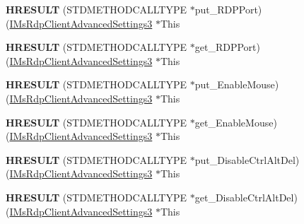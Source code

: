 \begin{DoxyCompactItemize}
{\bfseries H\+R\+E\+S\+U\+LT} (S\+T\+D\+M\+E\+T\+H\+O\+D\+C\+A\+L\+L\+T\+Y\+PE $\ast$put\+\_\+\+R\+D\+P\+Port)(\hyperlink{interface_m_s_t_s_c_lib_1_1_i_ms_rdp_client_advanced_settings3}{I\+Ms\+Rdp\+Client\+Advanced\+Settings3} $\ast$This
\item 
\mbox{\label{struct_m_s_t_s_c_lib_1_1_i_ms_rdp_client_advanced_settings3_vtbl_a5842e89ca96adf855c960ec213bbe825}} 
{\bfseries H\+R\+E\+S\+U\+LT} (S\+T\+D\+M\+E\+T\+H\+O\+D\+C\+A\+L\+L\+T\+Y\+PE $\ast$get\+\_\+\+R\+D\+P\+Port)(\hyperlink{interface_m_s_t_s_c_lib_1_1_i_ms_rdp_client_advanced_settings3}{I\+Ms\+Rdp\+Client\+Advanced\+Settings3} $\ast$This
\item 
\mbox{\label{struct_m_s_t_s_c_lib_1_1_i_ms_rdp_client_advanced_settings3_vtbl_a4bc63d3a36edd831dcecfd59903cce02}} 
{\bfseries H\+R\+E\+S\+U\+LT} (S\+T\+D\+M\+E\+T\+H\+O\+D\+C\+A\+L\+L\+T\+Y\+PE $\ast$put\+\_\+\+Enable\+Mouse)(\hyperlink{interface_m_s_t_s_c_lib_1_1_i_ms_rdp_client_advanced_settings3}{I\+Ms\+Rdp\+Client\+Advanced\+Settings3} $\ast$This
\item 
\mbox{\label{struct_m_s_t_s_c_lib_1_1_i_ms_rdp_client_advanced_settings3_vtbl_ac88cbe5e3994931e9931d70f1cb6f77b}} 
{\bfseries H\+R\+E\+S\+U\+LT} (S\+T\+D\+M\+E\+T\+H\+O\+D\+C\+A\+L\+L\+T\+Y\+PE $\ast$get\+\_\+\+Enable\+Mouse)(\hyperlink{interface_m_s_t_s_c_lib_1_1_i_ms_rdp_client_advanced_settings3}{I\+Ms\+Rdp\+Client\+Advanced\+Settings3} $\ast$This
\item 
\mbox{\label{struct_m_s_t_s_c_lib_1_1_i_ms_rdp_client_advanced_settings3_vtbl_ae3901e9ec0287322b65a1bdb7b8c9e2c}} 
{\bfseries H\+R\+E\+S\+U\+LT} (S\+T\+D\+M\+E\+T\+H\+O\+D\+C\+A\+L\+L\+T\+Y\+PE $\ast$put\+\_\+\+Disable\+Ctrl\+Alt\+Del)(\hyperlink{interface_m_s_t_s_c_lib_1_1_i_ms_rdp_client_advanced_settings3}{I\+Ms\+Rdp\+Client\+Advanced\+Settings3} $\ast$This
\item 
\mbox{\label{struct_m_s_t_s_c_lib_1_1_i_ms_rdp_client_advanced_settings3_vtbl_a0b711c0f029b173323916b5be3104af9}} 
{\bfseries H\+R\+E\+S\+U\+LT} (S\+T\+D\+M\+E\+T\+H\+O\+D\+C\+A\+L\+L\+T\+Y\+PE $\ast$get\+\_\+\+Disable\+Ctrl\+Alt\+Del)(\hyperlink{interface_m_s_t_s_c_lib_1_1_i_ms_rdp_client_advanced_settings3}{I\+Ms\+Rdp\+Client\+Advanced\+Settings3} $\ast$This

\end{DoxyCompactItemize}
